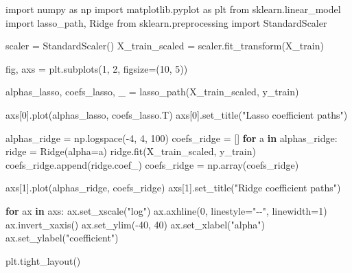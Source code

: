 \documentclass[
  letterpaper,
  DIV=11,
  numbers=noendperiod]{scrreprt}
\newenvironment{Shaded}{\begin{snugshade}}{\end{snugshade}}
\newcommand{\ControlFlowTok}[1]{\textcolor[rgb]{0.00,0.23,0.31}{\textbf{#1}}}
\newcommand{\DecValTok}[1]{\textcolor[rgb]{0.68,0.00,0.00}{#1}}
\newcommand{\ImportTok}[1]{\textcolor[rgb]{0.00,0.46,0.62}{#1}}
\newcommand{\KeywordTok}[1]{\textcolor[rgb]{0.00,0.23,0.31}{\textbf{#1}}}
\newcommand{\NormalTok}[1]{\textcolor[rgb]{0.00,0.23,0.31}{#1}}
\newcommand{\OperatorTok}[1]{\textcolor[rgb]{0.37,0.37,0.37}{#1}}
\newcommand{\StringTok}[1]{\textcolor[rgb]{0.13,0.47,0.30}{#1}}
\theoremstyle{definition}
\theoremstyle{definition}
\theoremstyle{plain}
\theoremstyle{plain}
\theoremstyle{remark}
\begin{document}
\begin{Shaded}
\begin{Highlighting}[]
\ImportTok{import}\NormalTok{ numpy }\ImportTok{as}\NormalTok{ np}
\ImportTok{import}\NormalTok{ matplotlib.pyplot }\ImportTok{as}\NormalTok{ plt}
\ImportTok{from}\NormalTok{ sklearn.linear\_model }\ImportTok{import}\NormalTok{ lasso\_path, Ridge}
\ImportTok{from}\NormalTok{ sklearn.preprocessing }\ImportTok{import}\NormalTok{ StandardScaler}

\NormalTok{scaler }\OperatorTok{=}\NormalTok{ StandardScaler()}
\NormalTok{X\_train\_scaled }\OperatorTok{=}\NormalTok{ scaler.fit\_transform(X\_train)}

\NormalTok{fig, axs }\OperatorTok{=}\NormalTok{ plt.subplots(}\DecValTok{1}\NormalTok{, }\DecValTok{2}\NormalTok{, figsize}\OperatorTok{=}\NormalTok{(}\DecValTok{10}\NormalTok{, }\DecValTok{5}\NormalTok{))}


\NormalTok{alphas\_lasso, coefs\_lasso, \_ }\OperatorTok{=}\NormalTok{ lasso\_path(X\_train\_scaled, y\_train)}

\NormalTok{axs[}\DecValTok{0}\NormalTok{].plot(alphas\_lasso, coefs\_lasso.T)}
\NormalTok{axs[}\DecValTok{0}\NormalTok{].set\_title(}\StringTok{"Lasso coefficient paths"}\NormalTok{)}

\NormalTok{alphas\_ridge }\OperatorTok{=}\NormalTok{ np.logspace(}\OperatorTok{{-}}\DecValTok{4}\NormalTok{, }\DecValTok{4}\NormalTok{, }\DecValTok{100}\NormalTok{)}
\NormalTok{coefs\_ridge }\OperatorTok{=}\NormalTok{ []}
\ControlFlowTok{for}\NormalTok{ a }\KeywordTok{in}\NormalTok{ alphas\_ridge:}
\NormalTok{    ridge }\OperatorTok{=}\NormalTok{ Ridge(alpha}\OperatorTok{=}\NormalTok{a)}
\NormalTok{    ridge.fit(X\_train\_scaled, y\_train)}
\NormalTok{    coefs\_ridge.append(ridge.coef\_)}
\NormalTok{coefs\_ridge }\OperatorTok{=}\NormalTok{ np.array(coefs\_ridge)}

\NormalTok{axs[}\DecValTok{1}\NormalTok{].plot(alphas\_ridge, coefs\_ridge)}
\NormalTok{axs[}\DecValTok{1}\NormalTok{].set\_title(}\StringTok{"Ridge coefficient paths"}\NormalTok{)}

\ControlFlowTok{for}\NormalTok{ ax }\KeywordTok{in}\NormalTok{ axs:}
\NormalTok{    ax.set\_xscale(}\StringTok{"log"}\NormalTok{)}
\NormalTok{    ax.axhline(}\DecValTok{0}\NormalTok{, linestyle}\OperatorTok{=}\StringTok{"{-}{-}"}\NormalTok{, linewidth}\OperatorTok{=}\DecValTok{1}\NormalTok{)}
\NormalTok{    ax.invert\_xaxis()}
\NormalTok{    ax.set\_ylim(}\OperatorTok{{-}}\DecValTok{40}\NormalTok{, }\DecValTok{40}\NormalTok{)}
\NormalTok{    ax.set\_xlabel(}\StringTok{"alpha"}\NormalTok{)}
\NormalTok{    ax.set\_ylabel(}\StringTok{"coefficient"}\NormalTok{)}

\NormalTok{plt.tight\_layout()}
\end{Highlighting}
\end{Shaded}
\end{document}
